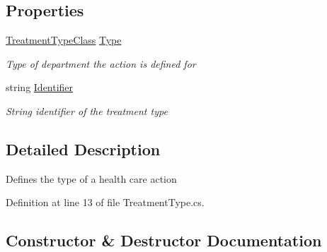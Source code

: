 \subsection*{Properties}
\begin{DoxyCompactItemize}
\item 
\hyperlink{namespace_enums_a818a2209a7496285390744fe2e319e3d}{Treatment\+Type\+Class} \hyperlink{class_general_health_care_elements_1_1_treatment_admission_types_1_1_treatment_type_a635a2655be958c02a41f5922c1c1cbb5}{Type}
\begin{DoxyCompactList}\small\item\em Type of department the action is defined for \end{DoxyCompactList}\item 
string \hyperlink{class_general_health_care_elements_1_1_treatment_admission_types_1_1_treatment_type_a308d8c6f4a05246c4868c5bebb8619ce}{Identifier}
\begin{DoxyCompactList}\small\item\em String identifier of the treatment type \end{DoxyCompactList}\end{DoxyCompactItemize}


\subsection{Detailed Description}
Defines the type of a health care action 



Definition at line 13 of file Treatment\+Type.\+cs.



\subsection{Constructor \& Destructor Documentation}

